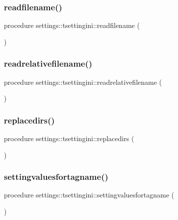 \subsubsection{\texorpdfstring{readfilename()}{readfilename()}}
{\footnotesize\ttfamily procedure settings\+::tsettingini\+::readfilename (\begin{DoxyParamCaption}{ }\end{DoxyParamCaption})}

\mbox{\label{structsettings_1_1tsettingini_aca86ab4a8cbcb80ceb32785a65329005}} 
\subsubsection{\texorpdfstring{readrelativefilename()}{readrelativefilename()}}
{\footnotesize\ttfamily procedure settings\+::tsettingini\+::readrelativefilename (\begin{DoxyParamCaption}{ }\end{DoxyParamCaption})}

\mbox{\label{structsettings_1_1tsettingini_a3ed949df4becdea6175a7a498de147ec}} 
\subsubsection{\texorpdfstring{replacedirs()}{replacedirs()}}
{\footnotesize\ttfamily procedure settings\+::tsettingini\+::replacedirs (\begin{DoxyParamCaption}{ }\end{DoxyParamCaption})}

\mbox{\label{structsettings_1_1tsettingini_a4ad2923f186902e83ba1e769baf3ab28}} 
\subsubsection{\texorpdfstring{settingvaluesfortagname()}{settingvaluesfortagname()}}
{\footnotesize\ttfamily procedure settings\+::tsettingini\+::settingvaluesfortagname (\begin{DoxyParamCaption}{ }\end{DoxyParamCaption})}

